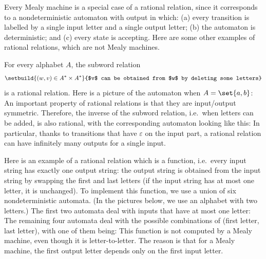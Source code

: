 Every Mealy machine is a special case of a rational relation, since it corresponds to a nondeterministic automaton with output in which: (a) every transition is labelled by a single input letter and a single output letter; (b) the automaton is deterministic; and (c) every state is accepting. Here are some other examples of rational relations, which are not Mealy machines.

\begin{myexample}
    For every alphabet $A$, the subword relation 
    \begin{align*}
    \setbuild{ (w,v) \in A^* \times A^*}{$v$ can be obtained from $w$ by deleting some letters}
    \end{align*}
    is a rational relation. Here is a picture of the automaton when $A = \set{a,b}$: 
    An important property of rational relations is that they are input/output symmetric. Therefore, the inverse of the subword relation, i.e.~when letters can be added, is also rational, with the corresponding automaton looking like this:
    In particular, thanks to transitions that have $\varepsilon$ on the input part, a rational relation can have infinitely many outputs for a single input.
\end{myexample}

\begin{myexample}
 Here is an example of a rational relation which is a function, i.e.~every input string has exactly one output string: the output string is obtained from the input string by swapping the first and last letters (if the input string has at most one letter, it is unchanged). To implement this function, we use a union of six nondeterministic automata. (In the pictures below, we use an alphabet with two letters.) The first two automata deal with inputs that have at most one letter:
The remaining four automata deal with the possible combinations of (first letter, last letter), with one of them being:
This function is not computed by a Mealy machine, even though it is letter-to-letter. The reason is that for a Mealy machine, the first output letter depends only on the first input letter.
\end{myexample}


